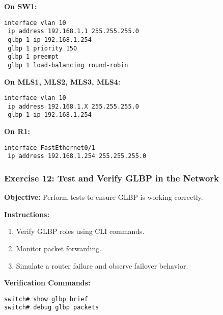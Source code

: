 \documentclass[12pt]{article}
\begin{document}
\textbf{On SW1:}
\begin{lstlisting}[style=CiscoCLI]
interface vlan 10
 ip address 192.168.1.1 255.255.255.0
 glbp 1 ip 192.168.1.254
 glbp 1 priority 150
 glbp 1 preempt
 glbp 1 load-balancing round-robin
\end{lstlisting}

\textbf{On MLS1, MLS2, MLS3, MLS4:}
\begin{lstlisting}[style=CiscoCLI]
interface vlan 10
 ip address 192.168.1.X 255.255.255.0
 glbp 1 ip 192.168.1.254
\end{lstlisting}

\textbf{On R1:}
\begin{lstlisting}[style=CiscoCLI]
interface FastEthernet0/1
 ip address 192.168.1.254 255.255.255.0
\end{lstlisting}

\bigskip

\subsubsection*{Exercise 12: Test and Verify GLBP in the Network}
\textbf{Objective:} Perform tests to ensure GLBP is working correctly.

\textbf{Instructions:}
\begin{enumerate}
\item Verify GLBP roles using CLI commands.
\item Monitor packet forwarding.
\item Simulate a router failure and observe failover behavior.
\end{enumerate}

\textbf{Verification Commands:}
\begin{lstlisting}[style=CiscoCLI]
switch# show glbp brief
switch# debug glbp packets
\end{lstlisting}
\end{document}
